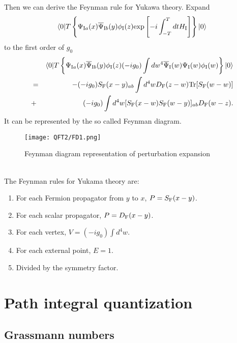 \noindent
Then we can derive the Feynman rule for Yukawa theory. 
Expand
\[\langle 0 | T \left\{ \Psi_{{\rm I}a}(x) \overline{\Psi}_{{\rm I}b}(y) \phi_{\rm I}(z) \mathrm{exp} \left[ -i \int_{-T}^{T} dt H_{\rm I} \right]\right\} | 0 \rangle\] 
to the first order of $g_0$
\begin{eqnarray}
& &\langle 0 | T \left\{ \Psi_{{\rm I}a}(x) \overline{\Psi}_{{\rm I}b}(y) \phi_{\rm {\rm I}}(z) (-i g_0) \int dw^4 \overline{\Psi}_{\rm I}(w) \Psi_{\rm I}(w) \phi_{\rm I}(w) \right\} | 0 \rangle \nonumber \\
&=& -(-ig_0) S_{\rm F}(x-y)_{ab} \int d^4 w D_{\rm F}(z-w) \mathrm{Tr}[S_{\rm F}(w-w)] \nonumber \\
&+&  (-ig_0) \int d^4 w  [S_{\rm F}(x-w) S_{\rm F}(w-y)]_{ab} D_{\rm F}(w-z) .\nonumber
\end{eqnarray}
It can be represented by the so called Feynman diagram.
\begin{figure}[!h]
\centering
\texttt{[image: QFT2/FD1.png]}
\caption{Feynman diagram representation of perturbation expansion}
\end{figure}\\
The Feynman rules for Yukama theory are:
\begin{enumerate}
\item For each Fermion propagator from $y$ to $x$, $P = S_{\rm F}(x-y)$.
\item For each scalar propagator, $P = D_{\rm F}(x-y)$.
\item For each vertex, $V = (-ig_0)\int d^4w$.
\item For each external point, $E=1$.
\item Divided by the symmetry factor.
\end{enumerate}

\section{Path integral quantization}
\subsection{Grassmann numbers}
